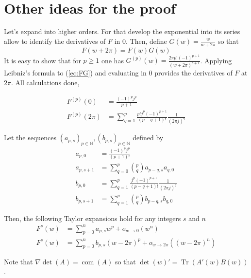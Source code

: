 \documentclass[a4paper, 11pt]{article}
\DeclareMathOperator*{\com}{com}
\DeclareMathOperator*{\Tr}{Tr}
\begin{document}
\section{Other ideas for the proof}

Let's expand into higher orders. For that develop the exponential into its series allow to identify the derivatives of 
$F$ in 0. Then, define $G(w) = \frac{w}{w+2\pi}$ so that
\begin{equation}\label{eq:FG}
  F(w+2\pi) = F(w) G(w)
\end{equation}
It is easy to show that for $p \geq 1$ one has $G^{(p)}(w) = \frac{2\pi p! {(-1)}^{p+1}}{{(w+2\pi)}^{p+1}}$. Applying 
Leibniz's formula to (\ref{eq:FG}) and evaluating in $0$ provides the derivatives of $F$ at $2\pi$. All calculations 
done, 

\begin{align*}
  F^{(p)}(0) &= \frac{{(-1)}^{p} j^p}{p+1}  \\
  F^{(p)}(2\pi) &=  \sum_{q=1}^p \frac{p!j^p {(-1)}^{p+1}}{(p-q+1)!} \frac{1}{{(2\pi j)}^q}
\end{align*}

Let the sequences ${(a_{p,s})}_{p \in \mathbb{N}},{(b_{p,s})}_{p \in \mathbb{N}}$ defined by
\begin{align*}
  a_{p,0} &= \frac{{(-1)}^{p} j^p}{(p+1)!} \\
  a_{p,s+1} &= \sum_{q=0}^p \binom{p}{q} a_{p-q,s} a_{q,0} \\
  b_{p, 0} &= \sum_{q=1}^p \frac{j^p {(-1)}^{p+1}}{(p-q+1)!} \frac{1}{{(2\pi j)}^q} \\
  b_{p,s+1} &= \sum_{q=1}^p \binom{p}{q} b_{p-q,s} b_{q,0}
\end{align*}

Then, the following Taylor expansions hold for any integers $s$ and $n$
\begin{align}
  F^s(w) &= \sum_{p=0}^{n} a_{p,s} w^p + o_{w \to 0}(w^{n}) \\
  F^s(w) &= \sum_{p=0}^{n} b_{p,s} {(w-2\pi)}^p + o_{w \to 2\pi}({(w-2\pi)}^{n})
\end{align}

Note that $\nabla \det(A) = \com(A)$ so that $\det(w)' = \Tr (A'(w) B(w))$. 
\end{document}
